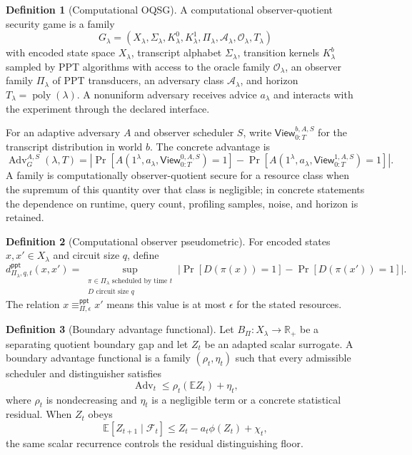 \documentclass[11pt]{article}
\theoremstyle{definition}
\newtheorem{definition}{Definition}[section]
\theoremstyle{plain}
\theoremstyle{remark}
\DeclareMathOperator{\poly}{poly}
\newcommand{\E}{\mathbb{E}}
\newcommand{\cA}{\mathcal{A}}
\newcommand{\cF}{\mathcal{F}}
\newcommand{\cO}{\mathcal{O}}
\newcommand{\Adv}{\operatorname{Adv}}
\begin{document}
\begin{definition}[Computational OQSG]
A computational observer-quotient security game is a family
\[
    G_\lambda=(X_\lambda,\Sigma_\lambda,K^0_\lambda,K^1_\lambda,\Pi_\lambda,\cA_\lambda,\cO_\lambda,T_\lambda)
\]
with encoded state space $X_\lambda$, transcript alphabet $\Sigma_\lambda$, transition kernels $K^b_\lambda$ sampled by PPT algorithms with access to the oracle family $\cO_\lambda$, an observer family $\Pi_\lambda$ of PPT transducers, an adversary class $\cA_\lambda$, and horizon $T_\lambda=\poly(\lambda)$. A nonuniform adversary receives advice $a_\lambda$ and interacts with the experiment through the declared interface.
\end{definition}

For an adaptive adversary $A$ and observer scheduler $S$, write $\mathsf{View}^{b,A,S}_{0:T}$ for the transcript distribution in world $b$. The concrete advantage is
\[
\Adv^{A,S}_{G}(\lambda,T)=\left|\Pr[A(1^\lambda,a_\lambda,\mathsf{View}^{0,A,S}_{0:T})=1]-\Pr[A(1^\lambda,a_\lambda,\mathsf{View}^{1,A,S}_{0:T})=1]\right|.
\]
A family is computationally observer-quotient secure for a resource class when the supremum of this quantity over that class is negligible; in concrete statements the dependence on runtime, query count, profiling samples, noise, and horizon is retained.

\begin{definition}[Computational observer pseudometric]
For encoded states $x,x'\in X_\lambda$ and circuit size $q$, define
\[
 d^{\mathsf{ppt}}_{\Pi_\lambda,q,t}(x,x') =
 \sup_{\substack{\pi\in\Pi_\lambda\text{ scheduled by time }t\\D\text{ circuit size }q}}
 \left|\Pr[D(\pi(x))=1]-\Pr[D(\pi(x'))=1]\right|.
\]
The relation $x\equiv^{\mathsf{ppt}}_{\Pi,\epsilon}x'$ means this value is at most $\epsilon$ for the stated resources.
\end{definition}

\begin{definition}[Boundary advantage functional]
Let $B_\Pi:X_\lambda\to\mathbb R_+$ be a separating quotient boundary gap and let $Z_t$ be an adapted scalar surrogate. A boundary advantage functional is a family $(\rho_t,\eta_t)$ such that every admissible scheduler and distinguisher satisfies
\[
\Adv_t\le \rho_t(\E Z_t)+\eta_t,
\]
where $\rho_t$ is nondecreasing and $\eta_t$ is a negligible term or a concrete statistical residual. When $Z_t$ obeys
\[
\E[Z_{t+1}\mid\cF_t]\le Z_t-a_t\phi(Z_t)+\chi_t,
\]
the same scalar recurrence controls the residual distinguishing floor.
\end{definition}
\end{document}
